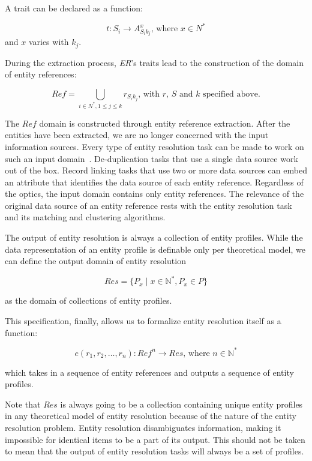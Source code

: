 \documentclass[journal]{IEEEtran}
\begin{document}
    A trait can be declared as a function:

    \[
        t: S_i \rightarrow A_{{S_i}{k_j}}^x\textrm{, where }x \in N^*
    \]
    and $x$ varies with $k_j$.

    During the extraction process, \textit{ER}'s traits lead to the construction
    of the domain of entity references:

    \[
        Ref = \bigcup_{i \in N^*,1 \leq j \leq k} r_{{S_i}{k_j}}
        \textrm{, with } r \textrm{, }S \textrm{ and } k \textrm{ specified above.}
    \]

    The $Ref$ domain is constructed through entity reference extraction.
    After the entities have been extracted, we are no longer concerned with the
    input information sources.
    Every type of entity resolution task can be made to work on such an input
    domain~\cite{Pap19}.
    De-duplication tasks that use a single data source work out of the box.
    Record linking tasks that use two or more data sources can embed an
    attribute that identifies the data source of each entity reference.
    Regardless of the optics, the input domain contains only entity references.
    The relevance of the original data source of an entity reference rests with
    the entity resolution task and its matching and clustering algorithms.

    The output of entity resolution is always a collection of entity profiles.
    While the data representation of an entity profile is definable only per
    theoretical model, we can define the output domain of entity resolution

    \[
        Res=\{P_x \mid x \in \mathbb{N^*}, P_x \in P\}
    \]

    \noindent
    as the domain of collections of entity profiles.

    This specification, finally, allows us to formalize entity resolution itself as a function:

    \[
        e(r_1, r_2, \ldots, r_n): Ref^n \rightarrow Res\text{, where }n\in\mathbb{N^*}
    \]
    
    \noindent
    which takes in a sequence of entity references and outputs a sequence of
    entity profiles.

    Note that $Res$ is always going to be a collection containing unique entity
    profiles in any theoretical model of entity resolution because of the nature
    of the entity resolution problem.
    Entity resolution disambiguates information, making it impossible for
    identical items to be a part of its output.
    This should not be taken to mean that the output of entity resolution tasks
    will always be a set of profiles.
\end{document}
